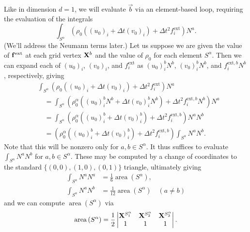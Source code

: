 Like in dimension $d = 1$, we will evaluate $\vec{b}$ via an element-based loop, requiring the evaluation of the integrals
\begin{equation*}
\int_{S^{\alpha}} \left( \rho_0 \left( (u_0)_i + \Delta t (v_0)_i \right) + \Delta t^2 f^{\text{ext}}_i \right) N^a.
\end{equation*}
(We'll address the Neumann terms later.) Let us suppose we are given the value of $\mathbf{f}^{\text{ext}}$ at each grid vertex $\mathbf{X}^b$ and the value of $\rho_0$ for each element $S^{\alpha}$. Then we can expand each of $(u_0)_i$, $(v_0)_i$, and $f^{\text{ext}}_i$ as $(u_0)_i^b N^b$, $(v_0)_i^b N^b$, and $f^{\text{ext},b}_i N^b$, respectively, giving
\begin{equation*}
\begin{split}
& \int_{S^{\alpha}} \left( \rho_0 \left( (u_0)_i + \Delta t (v_0)_i \right) + \Delta t^2 f^{\text{ext}}_i \right) N^a \\
& \quad = \int_{S^{\alpha}} \left( \rho_0^{\alpha} \left( (u_0)_i^b N^b + \Delta t (v_0)_i^b N^b \right) + \Delta t^2 f^{\text{ext},b}_i N^b \right) N^a \\
& \quad = \int_{S^{\alpha}} \left( \rho_0^{\alpha} \left( (u_0)_i^b + \Delta t (v_0)_i^b \right) + \Delta t^2 f^{\text{ext},b}_i \right) N^a N^b \\
& \quad = \left( \rho_0^{\alpha} \left( (u_0)_i^b + \Delta t (v_0)_i^b \right) + \Delta t^2 f^{\text{ext},b}_i \right) \int_{S^{\alpha}} N^a N^b.
\end{split}
\end{equation*}
Note that this will be nonzero only for $a,b \in S^{\alpha}$. It thus suffices to evaluate $\int_{S^{\alpha}} N^a N^b$ for $a,b \in S^{\alpha}$. These may be computed by a change of coordinates to the standard $\{(0,0), (1,0), (0,1)\}$ triangle, ultimately giving
\begin{subequations} \label{eq:integral_Na_Nb.2d}
\begin{align}
\int_{S^{\alpha}} N^a N^a & = \frac{1}{6} \operatorname{area} \left( S^{\alpha} \right), \\
\int_{S^{\alpha}} N^a N^b & = \frac{1}{12} \operatorname{area} \left( S^{\alpha} \right) \quad \left( a \neq b \right)
\end{align}
\end{subequations}
and we can compute $\operatorname{area} \left( S^{\alpha} \right)$ via
\begin{equation*}
\operatorname{area} \left( S^{\alpha} \right) = \frac{1}{2} \begin{vmatrix} \mathbf{X}^{S^{\alpha}_1} & \mathbf{X}^{S^{\alpha}_2} & \mathbf{X}^{S^{\alpha}_3} \\ 1 & 1 & 1 \end{vmatrix}.
\end{equation*}
